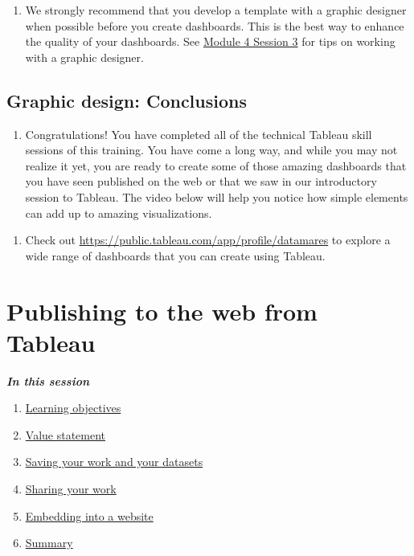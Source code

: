 \documentclass[
]{book}
\providecommand{\tightlist}{%
  \setlength{\itemsep}{0pt}\setlength{\parskip}{0pt}}
\begin{document}
\begin{enumerate}
\def\labelenumi{\arabic{enumi}.}
\tightlist
\item
  We strongly recommend that you develop a template with a graphic designer when possible before you create dashboards. This is the best way to enhance the quality of your dashboards. See \protect\hyperlink{working-with-graphic-designers}{Module 4 Session 3} for tips on working with a graphic designer.
\end{enumerate}

\hypertarget{graphic-design-conclusions}{%
\subsection{Graphic design: Conclusions}\label{graphic-design-conclusions}}

\begin{enumerate}
\def\labelenumi{\arabic{enumi}.}
\tightlist
\item
  Congratulations! You have completed all of the technical Tableau skill sessions of this training. You have come a long way, and while you may not realize it yet, you are ready to create some of those amazing dashboards that you have seen published on the web or that we saw in our introductory session to Tableau. The video below will help you notice how simple elements can add up to amazing visualizations.
\end{enumerate}

\begin{enumerate}
\def\labelenumi{\arabic{enumi}.}
\setcounter{enumi}{1}
\tightlist
\item
  Check out \url{https://public.tableau.com/app/profile/datamares} to explore a wide range of dashboards that you can create using Tableau.
\end{enumerate}

\hypertarget{publishing-to-the-web-from-tableau}{%
\section{Publishing to the web from Tableau}\label{publishing-to-the-web-from-tableau}}

\textbf{\emph{In this session }}

\begin{enumerate}
\def\labelenumi{\arabic{enumi}.}
\tightlist
\item
  \protect\hyperlink{Publishing-to-the-web-learning-objectives}{Learning objectives}
\item
  \protect\hyperlink{Publishing-to-the-web-value-statement}{Value statement}
\item
  \protect\hyperlink{saving-your-work-and-your-datasets}{Saving your work and your datasets}
\item
  \protect\hyperlink{sharing-your-work}{Sharing your work}
\item
  \protect\hyperlink{embedding-into-a-website}{Embedding into a website}
\item
  \protect\hyperlink{publishing-to-the-web-summary}{Summary}
\end{enumerate}
\end{document}
